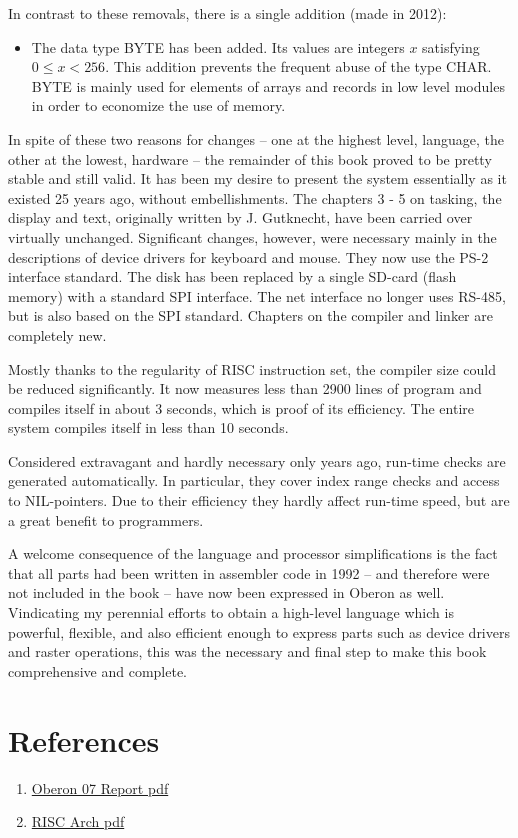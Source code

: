 In contrast to these removals, there is a single addition (made in 2012):
\begin{itemize}
  \item The data type BYTE has been added. Its values are integers $x$ satisfying $0 \leq x < 256$. This addition prevents the frequent abuse of the type CHAR. BYTE is mainly used for elements of arrays and records in low level modules in order to economize the use of memory.
\end{itemize}

In spite of these two reasons for changes -- one at the highest level, language, the other at the lowest, hardware -- the remainder of this book proved to be pretty stable and still valid. It has
been my desire to present the system essentially as it existed 25 years ago, without embellishments. The chapters 3 - 5 on tasking, the display and text, originally written by J. Gutknecht, have been carried over virtually unchanged. Significant changes, however, were
necessary mainly in the descriptions of device drivers for keyboard and mouse. They now use the PS-2 interface standard. The disk has been replaced by a single SD-card (flash memory) with a standard SPI interface. The net interface no longer uses RS-485, but is also based on the SPI standard. Chapters on the compiler and linker are completely new.

Mostly thanks to the regularity of RISC instruction set, the compiler size could be reduced significantly. It now measures less than 2900 lines of program and compiles itself in about 3 seconds, which is proof of its efficiency. The entire system compiles itself in less than 10 seconds.

Considered extravagant and hardly necessary only years ago, run-time checks are generated
automatically. In particular, they cover index range checks and access to NIL-pointers. Due to their
efficiency they hardly affect run-time speed, but are a great benefit to programmers.

A welcome consequence of the language and processor simplifications is the fact that all parts had been written in assembler code in 1992 -- and therefore were not included in the book -- have now been expressed in Oberon as well. Vindicating my perennial efforts to obtain a high-level
language which is powerful, flexible, and also efficient enough to express parts such as device drivers and raster operations, this was the necessary and final step to make this book comprehensive and complete.

\section*{References}
\begin{enumerate}
  \item \href{
    http://www.inf.ethz.ch/personal/wirth/Oberon/Oberon07.Report.pdf
  }{Oberon 07 Report pdf}
  \item \href{
    http://www.inf.ethz.ch/personal/wirth/FPGA-relatedWork/RISC.Arch.pdf
  }{RISC Arch pdf}
\end{enumerate}

